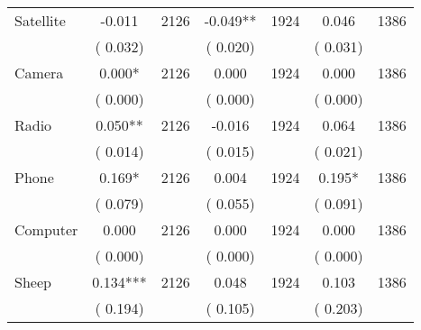 \begin{tabular}{l*{6}{c}}
Satellite        &             -0.011      &       2126       &             -0.049**      &       1924       &              0.046      &       1386       \\
                       &       (       0.032)            &                               &       (       0.020)            &                               &       (       0.031)            &                               \\
Camera        &              0.000*      &       2126       &              0.000      &       1924       &              0.000      &       1386       \\
                       &       (       0.000)            &                               &       (       0.000)            &                               &       (       0.000)            &                               \\
Radio        &              0.050**      &       2126       &             -0.016      &       1924       &              0.064      &       1386       \\
                       &       (       0.014)            &                               &       (       0.015)            &                               &       (       0.021)            &                               \\
Phone        &              0.169*      &       2126       &              0.004      &       1924       &              0.195*      &       1386       \\
                       &       (       0.079)            &                               &       (       0.055)            &                               &       (       0.091)            &                               \\
Computer        &              0.000      &       2126       &              0.000      &       1924       &              0.000      &       1386       \\
                       &       (       0.000)            &                               &       (       0.000)            &                               &       (       0.000)            &                               \\
Sheep        &              0.134***      &       2126       &              0.048      &       1924       &              0.103      &       1386       \\
                       &       (       0.194)            &                               &       (       0.105)            &                               &       (       0.203)            &                               \\

\end{tabular}
